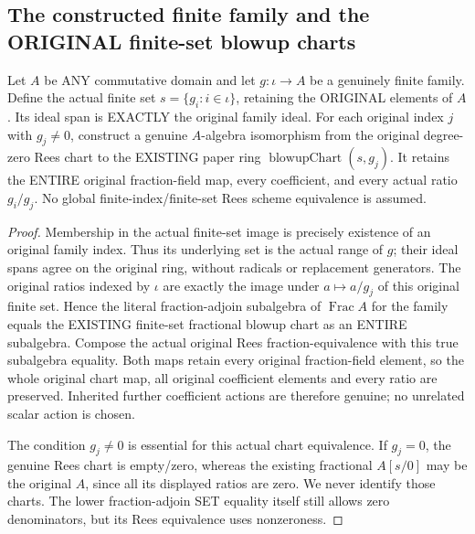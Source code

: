 \subsection{The constructed finite family and the ORIGINAL finite-set blowup charts}

\begin{lemma}
\label{paper:actual-finite-family-original-blowup-chart}
Let $A$ be ANY commutative domain and let $g:\iota\to A$ be a genuinely finite
family. Define the actual finite set $s=\{g_i:i\in\iota\}$, retaining the
ORIGINAL elements of $A$. Its ideal span is EXACTLY the original family ideal.
For each original index $j$ with $g_j\ne0$, construct a genuine $A$-algebra
isomorphism from the original degree-zero Rees chart to the EXISTING paper
ring $\operatorname{blowupChart}(s,g_j)$. It retains the ENTIRE original
fraction-field map, every coefficient, and every actual ratio $g_i/g_j$.
No global finite-index/finite-set Rees scheme equivalence is assumed.
\leanok
\end{lemma}
\begin{proof}
Membership in the actual finite-set image is precisely existence of an original
family index. Thus its underlying set is the actual range of $g$; their ideal
spans agree on the original ring, without radicals or replacement generators.
The original ratios indexed by $\iota$ are exactly the image under $a\mapsto a/g_j$
of this original finite set. Hence the literal fraction-adjoin subalgebra of
$\operatorname{Frac}A$ for the family equals the EXISTING finite-set fractional
blowup chart as an ENTIRE subalgebra. Compose the actual original Rees
fraction-equivalence with this true subalgebra equality. Both maps retain every
original fraction-field element, so the whole original chart map, all original
coefficient elements and every ratio are preserved. Inherited further coefficient
actions are therefore genuine; no unrelated scalar action is chosen.

The condition $g_j\ne0$ is essential for this actual chart equivalence. If
$g_j=0$, the genuine Rees chart is empty/zero, whereas the existing fractional
$A[s/0]$ may be the original $A$, since all its displayed ratios are zero.
We never identify those charts. The lower fraction-adjoin SET equality itself
still allows zero denominators, but its Rees equivalence uses nonzeroness.
\end{proof}

